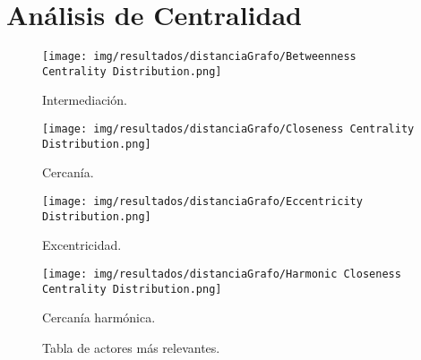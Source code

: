 \section{Análisis de Centralidad}

\begin{figure}[ht]
    \centerfloat
    \texttt{[image: img/resultados/distanciaGrafo/Betweenness Centrality Distribution.png]}
    \caption{Intermediación.}
\end{figure}

\begin{figure}[ht]
    \centerfloat
    \texttt{[image: img/resultados/distanciaGrafo/Closeness Centrality Distribution.png]}
    \caption{Cercanía.}
\end{figure}

\begin{figure}[ht]
    \centerfloat
    \texttt{[image: img/resultados/distanciaGrafo/Eccentricity Distribution.png]}
    \caption{Excentricidad.}
\end{figure}

\begin{figure}[ht]
    \centerfloat
    \texttt{[image: img/resultados/distanciaGrafo/Harmonic Closeness Centrality Distribution.png]}
    \caption{Cercanía harmónica.}
\end{figure}

\begin{figure}[t]
    \centering
    \caption{Tabla de actores más relevantes.}
\end{figure}